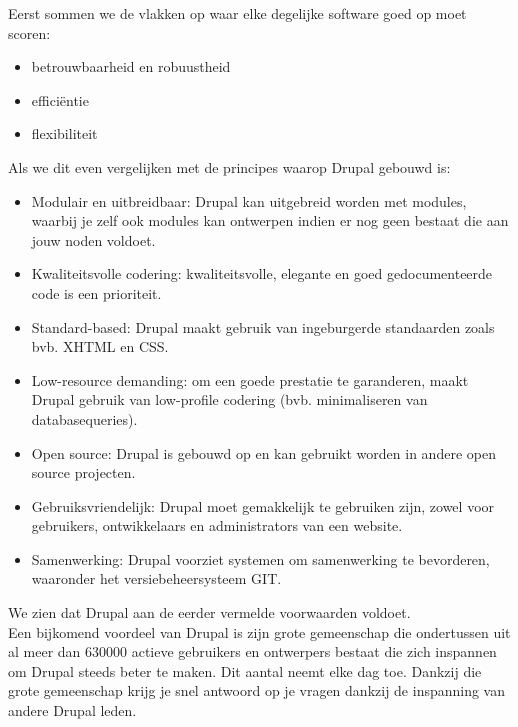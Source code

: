 Eerst sommen we de vlakken op waar elke degelijke software goed op moet scoren:
\begin{itemize}
\item betrouwbaarheid en robuustheid
\item effici\"{e}ntie
\item flexibiliteit
\end{itemize}
Als we dit even vergelijken met de principes waarop Drupal gebouwd is:
\begin{itemize}
\item Modulair en uitbreidbaar: Drupal kan uitgebreid worden met modules, waarbij je zelf ook modules kan ontwerpen indien er nog geen bestaat die aan jouw noden voldoet.
\item Kwaliteitsvolle codering: kwaliteitsvolle, elegante en goed gedocumenteerde code is een prioriteit.
\item Standard-based: Drupal maakt gebruik van ingeburgerde standaarden zoals bvb. XHTML en CSS.
\item Low-resource demanding: om een goede prestatie te garanderen, maakt Drupal gebruik van low-profile codering (bvb. minimaliseren van databasequeries).
\item Open source: Drupal is gebouwd op en kan gebruikt worden in andere open source projecten.
\item Gebruiksvriendelijk: Drupal moet gemakkelijk te gebruiken zijn, zowel voor gebruikers, ontwikkelaars en administrators van een website.
\item Samenwerking: Drupal voorziet systemen om samenwerking te bevorderen, waaronder het versiebeheersysteem GIT.
\end{itemize}
We zien dat Drupal aan de eerder vermelde voorwaarden voldoet.\\

Een bijkomend voordeel van Drupal is zijn grote gemeenschap die ondertussen uit al meer dan 630000 actieve gebruikers en ontwerpers bestaat die zich inspannen om Drupal steeds beter te maken. Dit aantal neemt elke dag toe. Dankzij die grote gemeenschap krijg je snel antwoord op je vragen dankzij de inspanning van andere Drupal leden.\\

